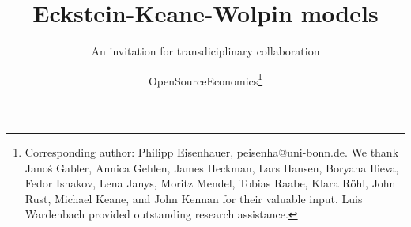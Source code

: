 
\title{Eckstein-Keane-Wolpin models}
\subtitle{An invitation for transdiciplinary collaboration}
\author{OpenSourceEconomics\thanks{Corresponding author: Philipp Eisenhauer, peisenha@uni-bonn.de. We thank  Jano\'s Gabler, Annica Gehlen, James Heckman, Lars Hansen, Boryana Ilieva, Fedor Ishakov, Lena Janys, Moritz Mendel, Tobias Raabe, Klara R\"ohl, John Rust, Michael Keane, and John Kennan for their valuable input. Luis Wardenbach provided outstanding research assistance.}}
\date{}
